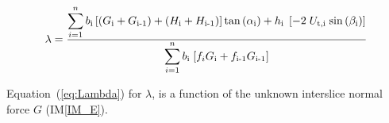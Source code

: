 \documentclass[12pt]{article}
\newcommand{\iref}[1]{IM\ref{#1}}
\begin{document}
\begin{equation}\label{eq:Lambda}
\lambda= \frac{ \displaystyle\sum_{i=1}^{n} { {b_{\text{i}}} \left[
      \left({{G}_{\text{i}} + {G}_{\text{i-1}}}\right) +
      \left({{H}_{\text{i}} + {H}_{\text{i-1}}}\right)
      \right]{\tan\left(\alpha_{\text{i}}\right)} \\ +
    {{h}_{\text{i}}}\;\left[ 
    -{2}\;{U_{\text{t,i}}}\;{\sin\left(\beta_{\text{i}}\right)} \right] }}
         {\displaystyle\sum_{i=1}^{n} { {{b}_{\text{i}}}\;{\left[{
                   {f_{i}}{{G}_{\text{i}}} +
                   {f_{\text{i-1}}}{{G}_{\text{i-1}}} }\right]} }}
\end{equation}

\noindent
Equation~(\ref{eq:Lambda}) for $\lambda$, is a function of the unknown
interslice normal force $G$ (\iref{IM_E}).

~\newline

\end{document}
